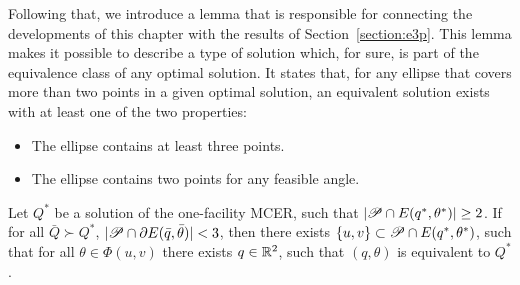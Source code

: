 
Following that, we introduce a lemma that is responsible for connecting the developments of this chapter with the results of Section~\ref{section:e3p}.
This lemma makes it possible to describe a type of solution which, for sure, is part of the equivalence class of any optimal solution.
It states that, for any ellipse that covers more than two points in a given optimal solution, an equivalent solution exists with at least one of the two properties:
\begin{itemize}
	\item The ellipse contains at least three points.
	\item The ellipse contains two points for any feasible angle.
\end{itemize}


\begin{lem}\label{lema:3pnts}
	Let $Q^*$ be a solution of the one-facility MCER, such that $|\mathscr{P} \cap E(q^*, \theta^*)|\ge2$.
	If for all $\bar{Q} \succ Q^*$, $|\mathscr{P} \cap \partial E(\bar{q}, \bar{\theta})| < 3$, then there exists $\{u, v\} \subset \mathscr{P} \cap E(q^*, \theta^*)$, such that for all $\theta\in \Phi(u,v)$ there exists $q \in \mathbb{R}^2$, such that $(q, \theta)$ is equivalent to $Q^*$.
\end{lem}

